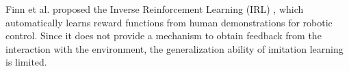 Finn et al. proposed the Inverse Reinforcement Learning (IRL) \cite{inverse}, which automatically learns reward functions from human demonstrations for robotic control. Since it does not provide a mechanism to obtain feedback from the interaction with the environment, the generalization ability of imitation learning is limited.




